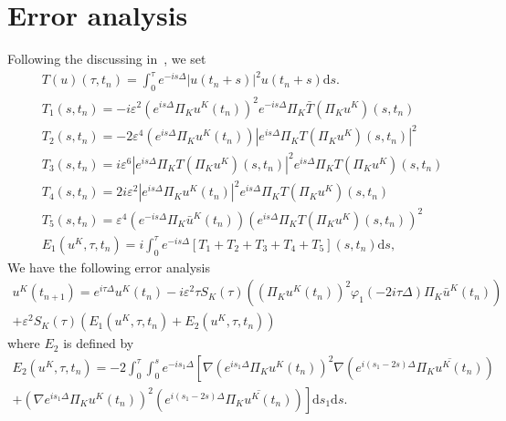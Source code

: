 \documentclass[10pt,a4paper]{article}
\begin{document}
  \section{Error analysis}
  Following the discussing in~\cite{ORS21}, we set
  \begin{align}
    \label{TOp}& T(u)(\tau,t_n) = \int_0^{\tau} e^{-is\Delta} |u(t_n+s)|^2 u(t_n+s) \mathrm{d} s.\\
    \label{T1} & T_1(s, t_n) = -i\varepsilon^2 \left(e^{i s \Delta} \Pi_K u^K\left(t_n\right)\right)^2 e^{-i s \Delta} \Pi_K \bar{T}\left(\Pi_K u^K\right)\left(s, t_n\right) \\
    \label{T2} & T_2(s, t_n) = -2\varepsilon^4 \left(e^{i s \Delta} \Pi_K u^K\left(t_n\right)\right)\left|e^{i s \Delta} \Pi_K T\left(\Pi_K u^K\right)\left(s, t_n\right)\right|^2 \\
    \label{T3} & T_3(s, t_n) = i\varepsilon^6 \left|e^{i s \Delta} \Pi_K T\left(\Pi_K u^K\right)\left(s, t_n\right)\right|^2 e^{i s \Delta} \Pi_K T\left(\Pi_K u^K\right)\left(s, t_n\right) \\
    \label{T4} & T_4(s, t_n) = 2i\varepsilon^2 \left|e^{i s \Delta} \Pi_K u^K\left(t_n\right)\right|^2 e^{i s \Delta} \Pi_K T\left(\Pi_K u^K\right)\left(s, t_n\right) \\
    \label{T5} & T_5(s, t_n) = \varepsilon^4 \left(e^{-i s \Delta} \Pi_K \bar{u}^K\left(t_n\right)\right)\left(e^{i s \Delta} \Pi_K T\left(\Pi_K u^K\right)\left(s, t_n\right)\right)^2 \\
    \label{E1} & E_1(u^K, \tau, t_n) = i \int_0^{\tau} e^{-is\Delta} 
    [T_1 + T_2 + T_3 + T_4 + T_5](s, t_n) \mathrm{d} s,
  \end{align}
  We have the following error analysis
  \begin{multline}
    u^K(t_{n+1}) = e^{i\tau\Delta}u^K(t_n) 
    - i\varepsilon^2\tau S_K(\tau) \left( \left(\Pi_K u^K(t_n)\right)^2 
    \varphi_1(-2i\tau\Delta)\Pi_K \bar{u}^K(t_n) \right) \\
    + \varepsilon^2 S_K(\tau) \left( E_1(u^K, \tau, t_n) + E_2(u^K, \tau, t_n) 
    \right)
  \end{multline}
  where \(E_2\) is defined by 
  \begin{multline}\label{E2}
    E_2(u^K, \tau, t_n) = -2 \int_0^{\tau} \int_0^s e^{-is_1\Delta} \left[
    \nabla \left(e^{is_1\Delta}\Pi_K u^K(t_n)\right)^2 
    \nabla \left(e^{i(s_1-2s)\Delta}\overline{\Pi_K u^K(t_n)}\right)\right. \\
    \left.+ \left( \nabla e^{is_1\Delta}\Pi_K u^K(t_n) \right)^2 
    \left( e^{i(s_1-2s)\Delta}\overline{\Pi_K u^K(t_n)} \right) 
    \right] \mathrm{d}s_1\mathrm{d}s .
  \end{multline}
  
\end{document}
